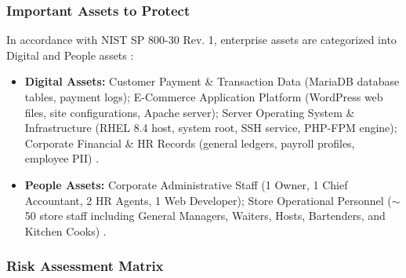 \documentclass[10pt,a4paper]{article}
\begin{document}
\subsubsection{Important Assets to Protect}
In accordance with NIST SP 800-30 Rev. 1, enterprise assets are categorized into Digital and People assets \cite{AkwaabaConfig, RiskGuide}:
\begin{itemize}[leftmargin=*]
    \item \textbf{Digital Assets:} Customer Payment \& Transaction Data (MariaDB database tables, payment logs); E-Commerce Application Platform (WordPress web files, site configurations, Apache server); Server Operating System \& Infrastructure (RHEL 8.4 host, system root, SSH service, PHP-FPM engine); Corporate Financial \& HR Records (general ledgers, payroll profiles, employee PII) \cite{AkwaabaConfig}.
    \item \textbf{People Assets:} Corporate Administrative Staff (1 Owner, 1 Chief Accountant, 2 HR Agents, 1 Web Developer); Store Operational Personnel ($\sim$50 store staff including General Managers, Waiters, Hosts, Bartenders, and Kitchen Cooks) \cite{AkwaabaConfig}.
\end{itemize}

\subsubsection{Risk Assessment Matrix}
\end{document}

